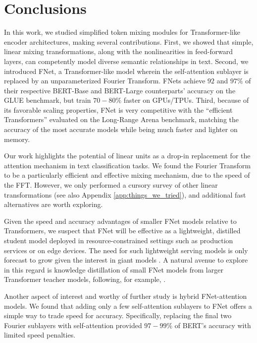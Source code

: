 \documentclass[11pt]{article}
\begin{document}
 \section{Conclusions}
\label{sec:conclusion}

In this work, we studied simplified token mixing modules for Transformer-like encoder architectures, making several contributions. First, we showed that simple, linear mixing transformations, along with the nonlinearities in feed-forward layers, can competently model diverse semantic relationships in text. Second, we introduced FNet, a Transformer-like model wherein the self-attention sublayer is replaced by an unparameterized Fourier Transform. FNets achieve $92$ and $97\%$ of their respective BERT-Base and BERT-Large counterparts' accuracy on the GLUE benchmark, but train $70-80\%$ faster on GPUs/TPUs. Third, because of its favorable scaling properties, FNet is very competitive with the ``efficient Transformers'' evaluated on the Long-Range Arena benchmark, matching the accuracy of the most accurate models while being much faster and lighter on memory. 

Our work highlights the potential of linear units as a drop-in replacement for the attention mechanism in text classification tasks. We found the Fourier Transform to be a particularly efficient and effective mixing mechanism, due to the speed of the FFT. However, we only performed a cursory survey of other linear transformations (see also Appendix \ref{app:things_we_tried}), and additional fast alternatives are worth exploring.

Given the speed and accuracy advantages of smaller FNet models relative to Transformers, we suspect that FNet will be effective as a lightweight, distilled student model deployed in resource-constrained settings such as production services or on edge devices. The need for such lightweight serving models is only forecast to grow given the interest in giant models \citep{raffel2019exploring, brown2020language, lepikhin2020gshard}. A natural avenue to explore in this regard is knowledge distillation of small FNet models from larger Transformer teacher models, following, for example, \citet{sanh2019distilbert, jiao2019tinybert, turc2019well}.

Another aspect of interest and worthy of further study is hybrid FNet-attention models. We found that adding only a few self-attention sublayers to FNet offers a simple way to trade speed for accuracy. Specifically, replacing the final two Fourier sublayers with self-attention provided $97-99\%$ of BERT's accuracy with limited speed penalties.
\end{document}

